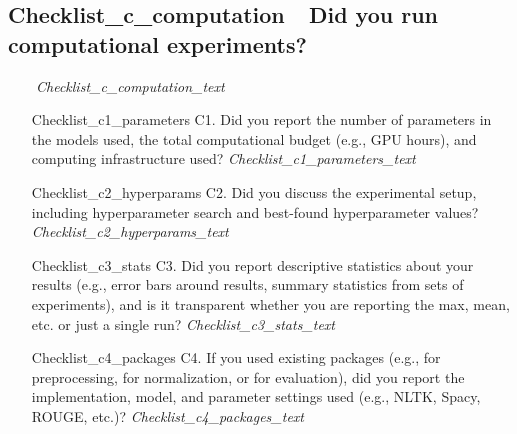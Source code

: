 \documentclass[11pt]{article}
\begin{document}
\subsection{{{Checklist_c_computation}}\ \ Did you run computational experiments?}
\ \ \ \ \textit{{{Checklist_c_computation_text}}}
\begin{itemize}
    \item[{{Checklist_c1_parameters}}] C1. Did you report the number of parameters in the models used, the total computational budget (e.g., GPU hours), and computing infrastructure used?
    \newline\textit{{{Checklist_c1_parameters_text}}}
    \item[{{Checklist_c2_hyperparams}}] C2. Did you discuss the experimental setup, including hyperparameter search and best-found hyperparameter values?
    \newline\textit{{{Checklist_c2_hyperparams_text}}}
    \item[{{Checklist_c3_stats}}] C3. Did you report descriptive statistics about your results (e.g., error bars around results, summary statistics from sets of experiments), and is it transparent whether you are reporting the max, mean, etc. or just a single run?
    \newline\textit{{{Checklist_c3_stats_text}}}
    \item[{{Checklist_c4_packages}}] C4. If you used existing packages (e.g., for preprocessing, for normalization, or for evaluation), did you report the implementation, model, and parameter settings used (e.g., NLTK, Spacy, ROUGE, etc.)?
    \newline\textit{{{Checklist_c4_packages_text}}}
\end{itemize}
\end{document}
